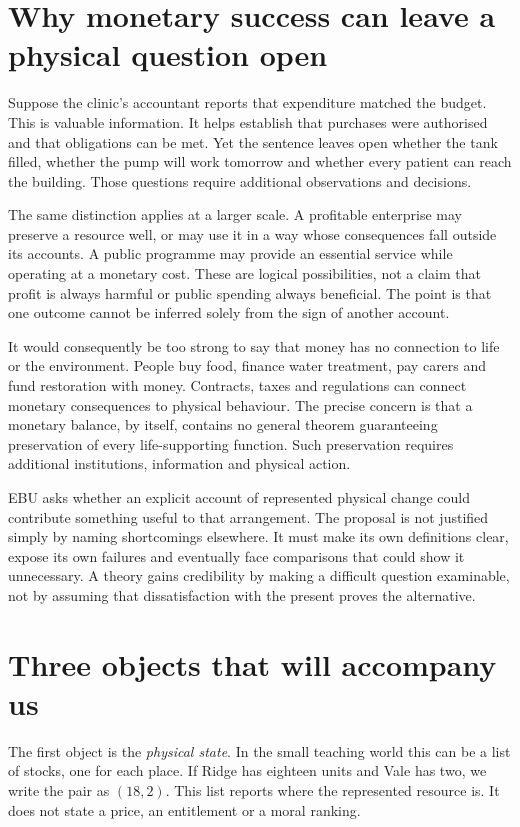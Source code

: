 \section{Why monetary success can leave a physical question open}
Suppose the clinic's accountant reports that expenditure matched the budget. This is valuable information. It helps establish that purchases were authorised and that obligations can be met. Yet the sentence leaves open whether the tank filled, whether the pump will work tomorrow and whether every patient can reach the building. Those questions require additional observations and decisions.

The same distinction applies at a larger scale. A profitable enterprise may preserve a resource well, or may use it in a way whose consequences fall outside its accounts. A public programme may provide an essential service while operating at a monetary cost. These are logical possibilities, not a claim that profit is always harmful or public spending always beneficial. The point is that one outcome cannot be inferred solely from the sign of another account.

It would consequently be too strong to say that money has no connection to life or the environment. People buy food, finance water treatment, pay carers and fund restoration with money. Contracts, taxes and regulations can connect monetary consequences to physical behaviour. The precise concern is that a monetary balance, by itself, contains no general theorem guaranteeing preservation of every life-supporting function. Such preservation requires additional institutions, information and physical action.

EBU asks whether an explicit account of represented physical change could contribute something useful to that arrangement. The proposal is not justified simply by naming shortcomings elsewhere. It must make its own definitions clear, expose its own failures and eventually face comparisons that could show it unnecessary. A theory gains credibility by making a difficult question examinable, not by assuming that dissatisfaction with the present proves the alternative.


\section{Three objects that will accompany us}
The first object is the \emph{physical state}. In the small teaching world this can be a list of stocks, one for each place. If Ridge has eighteen units and Vale has two, we write the pair as $(18,2)$. This list reports where the represented resource is. It does not state a price, an entitlement or a moral ranking.

